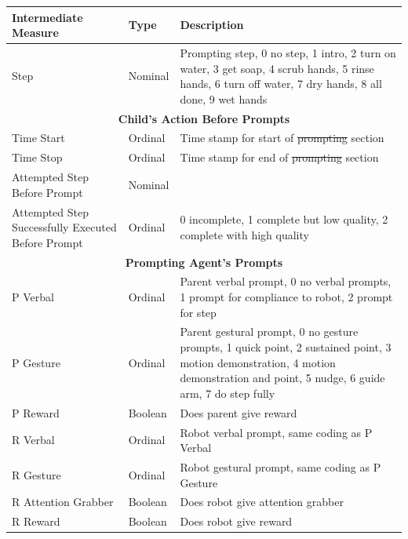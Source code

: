 \documentclass{ut-thesis}
\providecommand{\DIFaddtex}[1]{{\protect\color{blue}\uwave{#1}}} %
\providecommand{\DIFdeltex}[1]{{\protect\color{red}\sout{#1}}}                      %
\providecommand{\DIFaddFL}[1]{\DIFadd{#1}} %
\providecommand{\DIFdelFL}[1]{\DIFdel{#1}} %
\providecommand{\DIFaddbeginFL}{} %
\providecommand{\DIFaddendFL}{} %
\providecommand{\DIFdelbeginFL}{} %
\providecommand{\DIFdelendFL}{} %
\providecommand{\DIFadd}[1]{\texorpdfstring{\DIFaddtex{#1}}{#1}} %
\providecommand{\DIFdel}[1]{\texorpdfstring{\DIFdeltex{#1}}{}} %
\begin{document}
\begin{table}[h]
	\centering
	\begin{tabular}{ | p{5cm} | l | p{7cm} | }
		\hline
		\textbf{Intermediate Measure}	&	\textbf{Type}	&	\textbf{Description}	\\	\hline	\hline

		Step	&	Nominal	&	Prompting step, 0 no step, 1 intro, 2 turn on water, 3 get soap, 4 scrub hands, 5 rinse hands, 6 turn off water, 7 dry hands, 8 all done, 9 wet hands	\\	\hline \hline

		\multicolumn{3}{|c|}{\textbf{Child's Action Before Prompts}} \\	\hline

		Time Start	&	Ordinal	&	Time stamp for start of \DIFdelbeginFL \DIFdelFL{prompting }\DIFdelendFL \DIFaddbeginFL \DIFaddFL{the prompt }\DIFaddendFL section	\\	\hline
		Time Stop	&	Ordinal	&	Time stamp for end of \DIFdelbeginFL \DIFdelFL{prompting }\DIFdelendFL \DIFaddbeginFL \DIFaddFL{the prompt }\DIFaddendFL section	\\	\hline
		Attempted Step Before Prompt	&	Nominal	&		\\	\hline
		Attempted Step Successfully Executed Before Prompt	&	Ordinal	&	0 incomplete, 1 complete but low quality, 2 complete with high quality	\\	\hline	\hline

		\multicolumn{3}{|c|}{\textbf{Prompting Agent's Prompts}} \\	\hline

		P Verbal	&	Ordinal	&	Parent verbal prompt, 0 no verbal prompts, 1 prompt for compliance to robot, 2 prompt for step	\\	\hline
		P Gesture	&	Ordinal	&	Parent gestural prompt, 0 no gesture prompts, 1 quick point, 2 sustained point, 3 motion demonstration, 4 motion demonstration and point, 5 nudge, 6 guide arm, 7 do step fully	\\	\hline
		P Reward	&	Boolean	&	Does parent give reward	\\	\hline
		R Verbal	&	Ordinal	&	Robot verbal prompt, same coding as P Verbal	\\	\hline
		R Gesture	&	Ordinal	&	Robot gestural prompt, same coding as P Gesture	\\	\hline
		R Attention Grabber	&	Boolean	&	Does robot give attention grabber	\\	\hline
		R Reward	&	Boolean	&	Does robot give reward	\\	\hline	\hline


\end{tabular}
\end{table}
\end{document}

